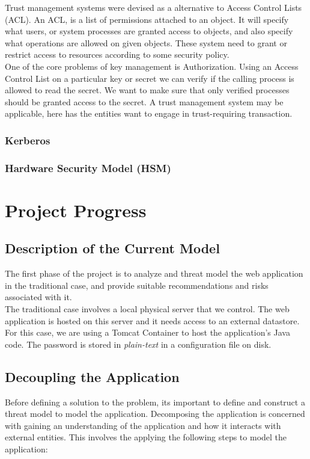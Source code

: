 \documentclass[11pt, a4paper, notitlepage]{article}
\begin{document}
Trust management systems were devised as a alternative to Access Control Lists (ACL). An ACL, is a list of permissions attached to an object. It will specify what users, or system processes are granted access to objects, and also specify what operations are allowed on given objects. \cite{acl-rfc} These system need to grant or restrict access to resources according to some security policy. \\

One of the core problems of key management is Authorization. Using an Access Control List on a particular key or secret we can verify if the calling process is allowed to read the secret. We want to make sure that only verified processes should be granted access to the secret. A trust management system may be applicable, here has the entities want to engage in trust-requiring transaction.\cite{herzberg2000access} \\


\subsubsection*{Kerberos}



\subsubsection*{Hardware Security Model (HSM)}


\section{Project Progress}
\subsection*{Description of the Current Model}
The first phase of the project is to analyze and threat model the web application in the traditional case, and provide suitable recommendations and risks associated with it. \\

The traditional case involves a local physical server that we control. The web application is hosted on this server and it needs access to an external datastore. For this case, we are using a Tomcat Container to host the application's Java code. The password is stored in \emph{plain-text} in a configuration file on disk. \\

\subsection*{Decoupling the Application}
Before defining a solution to the problem, its important to define and construct a threat model to model the application. Decomposing the application is concerned with gaining an understanding of the application and how it interacts with external entities. This involves the applying the following steps to model the application:  
\end{document}
